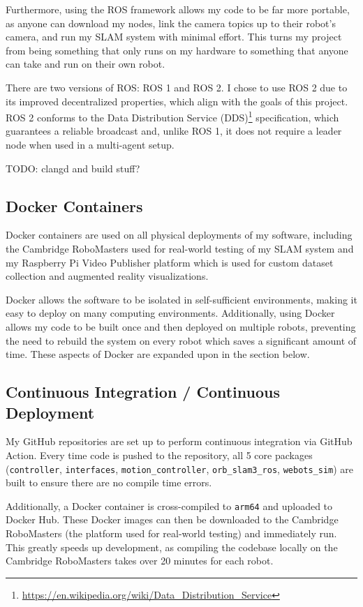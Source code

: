 Furthermore, using the ROS framework allows my code to be far more portable, as anyone can download my nodes, link the camera topics up to their robot's camera, and run my SLAM system with minimal effort. This turns my project from being something that only runs on my hardware to something that anyone can take and run on their own robot.

There are two versions of ROS: ROS 1 and ROS 2. I chose to use ROS 2 due to its improved decentralized properties, which align with the goals of this project. ROS 2 conforms to the Data Distribution Service (DDS)\footnote[1]{\url{https://en.wikipedia.org/wiki/Data_Distribution_Service}} specification, which guarantees a reliable broadcast and, unlike ROS 1, it does not require a leader node when used in a multi-agent setup.

TODO: clangd and build stuff?

\subsection{Docker Containers}
\label{sec:docker-containers}
Docker containers are used on all physical deployments of my software, including the Cambridge RoboMasters used for real-world testing of my SLAM system and my Raspberry Pi Video Publisher platform which is used for custom dataset collection and augmented reality visualizations.

Docker allows the software to be isolated in self-sufficient environments, making it easy to deploy on many computing environments. Additionally, using Docker allows my code to be built once and then deployed on multiple robots, preventing the need to rebuild the system on every robot which saves a significant amount of time. These aspects of Docker are expanded upon in the section below.

\subsection{Continuous Integration / Continuous Deployment}
\label{sec:cicd}
My GitHub repositories are set up to perform continuous integration via GitHub Action. Every time code is pushed to the repository, all 5 core packages (\texttt{controller}, \texttt{interfaces}, \texttt{motion\_controller}, \texttt{orb\_slam3\_ros}, \texttt{webots\_sim}) are built to ensure there are no compile time errors.

Additionally, a Docker container is cross-compiled to \texttt{arm64} and uploaded to Docker Hub. These Docker images can then be downloaded to the Cambridge RoboMasters (the platform used for real-world testing) and immediately run. This greatly speeds up development, as compiling the codebase locally on the Cambridge RoboMasters takes over 20 minutes for each robot.

